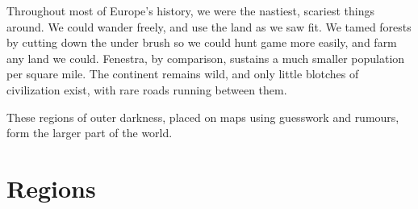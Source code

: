 \begin{multicols}{2}
Throughout most of Europe's history, we were the nastiest, scariest things around.
We could wander freely, and use the land as we saw fit.
We tamed forests by cutting down the under brush so we could hunt game more easily, and farm any land we could.
Fenestra, by comparison, sustains a much smaller population per square mile.
The continent remains wild, and only little blotches of civilization exist, with rare roads running between them.

These regions of outer darkness, placed on maps using guesswork and rumours, form the larger part of the world.

\end{multicols}

\section{Regions}
\label{regionEncounters}

